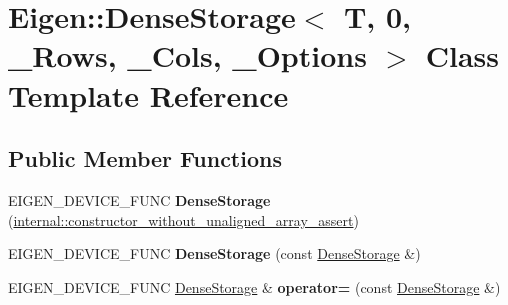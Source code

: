 \hypertarget{class_eigen_1_1_dense_storage_3_01_t_00_010_00_01___rows_00_01___cols_00_01___options_01_4}{}\section{Eigen\+:\+:Dense\+Storage$<$ T, 0, \+\_\+\+Rows, \+\_\+\+Cols, \+\_\+\+Options $>$ Class Template Reference}
\label{class_eigen_1_1_dense_storage_3_01_t_00_010_00_01___rows_00_01___cols_00_01___options_01_4}
\subsection*{Public Member Functions}
\begin{DoxyCompactItemize}
\item 
\mbox{\label{class_eigen_1_1_dense_storage_3_01_t_00_010_00_01___rows_00_01___cols_00_01___options_01_4_ab88114d52b9a7647ffea3bedb0a694dd}} 
E\+I\+G\+E\+N\+\_\+\+D\+E\+V\+I\+C\+E\+\_\+\+F\+U\+NC {\bfseries Dense\+Storage} (\hyperlink{struct_eigen_1_1internal_1_1constructor__without__unaligned__array__assert}{internal\+::constructor\+\_\+without\+\_\+unaligned\+\_\+array\+\_\+assert})
\item 
\mbox{\label{class_eigen_1_1_dense_storage_3_01_t_00_010_00_01___rows_00_01___cols_00_01___options_01_4_a25d0cd5f55ff9ff267c4bf6db81cda38}} 
E\+I\+G\+E\+N\+\_\+\+D\+E\+V\+I\+C\+E\+\_\+\+F\+U\+NC {\bfseries Dense\+Storage} (const \hyperlink{class_eigen_1_1_dense_storage}{Dense\+Storage} \&)
\item 
\mbox{\label{class_eigen_1_1_dense_storage_3_01_t_00_010_00_01___rows_00_01___cols_00_01___options_01_4_a15729244b3c67d4d9dbc16333d8873ba}} 
E\+I\+G\+E\+N\+\_\+\+D\+E\+V\+I\+C\+E\+\_\+\+F\+U\+NC \hyperlink{class_eigen_1_1_dense_storage}{Dense\+Storage} \& {\bfseries operator=} (const \hyperlink{class_eigen_1_1_dense_storage}{Dense\+Storage} \&)
\item 
\mbox{\label{class_eigen_1_1_dense_storage_3_01_t_00_010_00_01___rows_00_01___cols_00_01___options_01_4_a9a5c9a64f958b0df2be930120bd0c901}} 

\end{DoxyCompactItemize}
